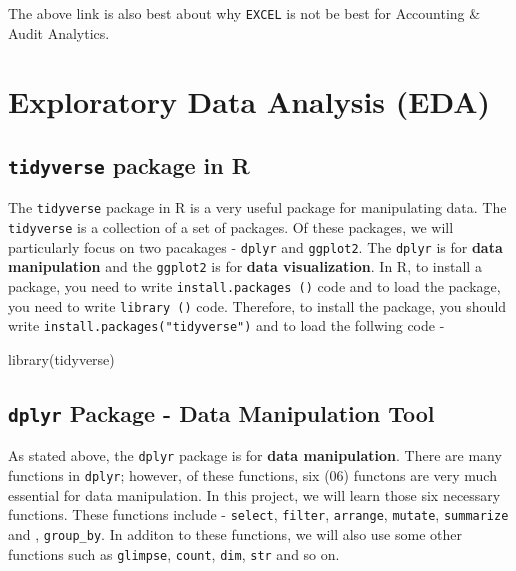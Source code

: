 \documentclass[
]{book}
\newenvironment{Shaded}{\begin{snugshade}}{\end{snugshade}}
\newcommand{\FunctionTok}[1]{\textcolor[rgb]{0.00,0.00,0.00}{#1}}
\newcommand{\NormalTok}[1]{#1}
\begin{document}
The above link is also best about why \texttt{EXCEL} is not be best for Accounting \& Audit Analytics.

\hypertarget{exploratory-data-analysis-eda}{%
\chapter{Exploratory Data Analysis (EDA)}\label{exploratory-data-analysis-eda}}

\hypertarget{tidyverse-package-in-r}{%
\section{\texorpdfstring{\texttt{tidyverse} package in R}{tidyverse package in R}}\label{tidyverse-package-in-r}}

The \texttt{tidyverse} package in R is a very useful package for manipulating data. The \texttt{tidyverse} is a collection of a set of packages. Of these packages, we will particularly focus on two pacakages - \texttt{dplyr} and \texttt{ggplot2}. The \texttt{dplyr} is for \textbf{data manipulation} and the \texttt{ggplot2} is for \textbf{data visualization}. In R, to install a package, you need to write \texttt{install.packages\ ()} code and to load the package, you need to write \texttt{library\ ()} code. Therefore, to install the package, you should write \texttt{install.packages("tidyverse")} and to load the follwing code -

\begin{Shaded}
\begin{Highlighting}[]
\FunctionTok{library}\NormalTok{(tidyverse)}
\end{Highlighting}
\end{Shaded}

\hypertarget{dplyr-package---data-manipulation-tool}{%
\section{\texorpdfstring{\texttt{dplyr} Package - Data Manipulation Tool}{dplyr Package - Data Manipulation Tool}}\label{dplyr-package---data-manipulation-tool}}

As stated above, the \texttt{dplyr} package is for \textbf{data manipulation}. There are many functions in \texttt{dplyr}; however, of these functions, six (06) functons are very much essential for data manipulation. In this project, we will learn those six necessary functions. These functions include - \texttt{select}, \texttt{filter}, \texttt{arrange}, \texttt{mutate}, \texttt{summarize} and , \texttt{group\_by}. In additon to these functions, we will also use some other functions such as \texttt{glimpse}, \texttt{count}, \texttt{dim}, \texttt{str} and so on.
\end{document}
